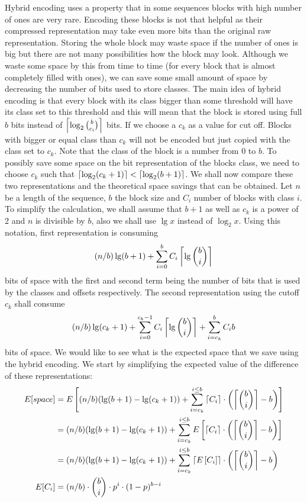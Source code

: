 Hybrid encoding uses a property that in some sequences blocks with high number
of ones are very rare. Encoding these blocks is not that helpful as their
compressed representation may take even more bits than the original raw
representation. Storing the whole block may waste space if the number of
ones is big but there are not many possibilities how the block may look.
Although we waste some space by this from time to time (for every
block that is almost completely filled with ones), we can save some small
amount of space by decreasing the number of bits used to store classes.
The main idea of hybrid encoding is that every block with its
class bigger than some threshold will have its class set to this threshold
and this will mean that the block is stored using full $b$ bits instead of
$\left\lceil \log_2{b\choose c_i} \right\rceil$ bits. If we choose a $c_k$ as a value for cut off.
Blocks with bigger or equal class than $c_k$ will not be encoded but just
copied with the class set to $c_k$. Note that the class of the block
is a number from 0 to $b$. To possibly save some space on the bit representation
of the blocks class, we need to choose $c_k$ such that $\left\lceil \log_2(c_k+1) \right\rceil < \left\lceil \log_2(b+1) \right\rceil$.
We shall now compare these two representations and the theoretical space savings that
can be obtained. Let $n$ be a length of the sequence, $b$ the block size and $C_i$
number of blocks with class $i$. To simplify the calculation, we shall assume that $b+1$
as well as $c_k$ is a power of 2 and $n$ is divisible by $b$, also we shall
use $\lg x$ instead of $\log_2 x$. Using this notation, first representation is
consuming $$(n/b)\lg (b+1) + \sum_{i=0}^{b} C_i\left\lceil \lg {b\choose i} \right\rceil$$
bits of space with the first and second term being the number of bits that
is used by the classes and offsets respectively. The second representation
using the cutoff $c_k$ shall consume $$(n/b)\lg (c_k+1)+\sum_{i=0}^{c_k-1}C_i\left\lceil \lg {b\choose i} \right\rceil + \sum_{i=c_k}^{b}C_i b$$
bits of space. We would like to see what is the expected space that we save
using the hybrid encoding. We start by simplifying the expected value of the
difference of these representations:
\begin{align} 
E[space] &= E\left[(n/b)(\lg(b+1)-\lg(c_k+1)) + \sum_{i=c_k}^{i\leq b}\left\lceil C_i \right\rceil\cdot \left(\left\lceil {b\choose i} \right\rceil - b\right)\right] \nonumber\\
&=(n/b)(\lg(b+1)-\lg(c_k+1)) + \sum_{i=c_k}^{i\leq b}E\left[\left\lceil C_i \right\rceil\cdot \left(\left\lceil {b\choose i} \right\rceil - b\right)\right] \nonumber\\
&=(n/b)(\lg(b+1)-\lg(c_k+1)) + \sum_{i=c_k}^{i\leq b}\left\lceil E\left[C_i\right] \right\rceil\cdot \left(\left\lceil {b\choose i} \right\rceil - b\right) \nonumber\\
E[C_i] &= (n/b)\cdot {b\choose i}\cdot p^i\cdot (1-p)^{b-i} \label{eq:hybrid_encoding_expected_c_i}
\end{align}

